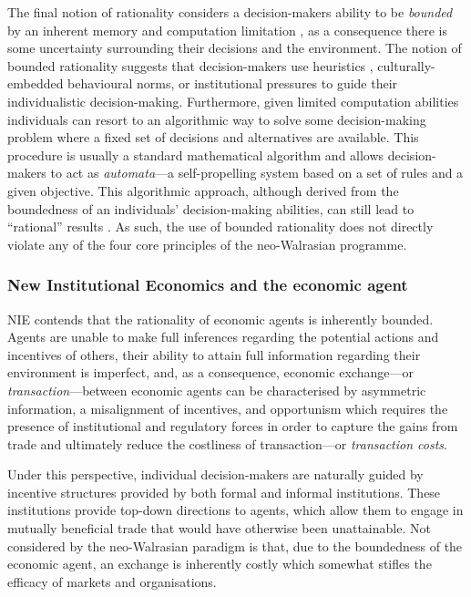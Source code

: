 The final notion of rationality considers a decision-makers ability to be \emph{bounded} by an inherent memory and computation limitation \citep{Simon1957, Simon1990, Simon1991b}, as a consequence there is some uncertainty surrounding their decisions and the environment. The notion of bounded rationality suggests that decision-makers use heuristics \citep{GigerenzerGaissmaier2011}, culturally-embedded behavioural norms, or institutional pressures \citep{Hodgson1997} to guide their individualistic decision-making. Furthermore, given limited computation abilities individuals can resort to an algorithmic way to solve some decision-making problem where a fixed set of decisions and alternatives are available. This procedure is usually a standard mathematical algorithm and allows decision-makers to act as \emph{automata}---a self-propelling system based on a set of rules and a given objective. This algorithmic approach, although derived from the boundedness of an individuals' decision-making abilities, can still lead to ``rational'' results \citep{Rubinstein1998}. As such, the use of bounded rationality does not directly violate any of the four core principles of the neo-Walrasian programme.

\subsubsection{New Institutional Economics and the economic agent}

NIE contends that the rationality of economic agents is inherently bounded. Agents are unable to make full inferences regarding the potential actions and incentives of others, their ability to attain full information regarding their environment is imperfect, and, as a consequence, economic exchange---or \emph{transaction}---between economic agents can be characterised by asymmetric information, a misalignment of incentives, and opportunism which requires the presence of institutional and regulatory forces in order to capture the gains from trade and ultimately reduce the costliness of transaction---or \emph{transaction costs}. 

Under this perspective, individual decision-makers are naturally guided by incentive structures provided by both formal and informal institutions. These institutions provide top-down directions to agents, which allow them to engage in mutually beneficial trade that would have otherwise been unattainable. Not considered by the neo-Walrasian paradigm is that, due to the boundedness of the economic agent, an exchange is inherently costly which somewhat stifles the efficacy of markets and organisations.

